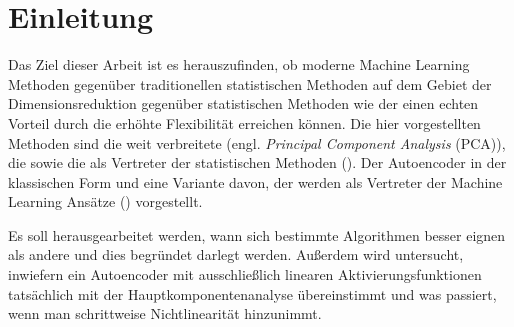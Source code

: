 \chapter{Einleitung}
\label{ch:Enleitung}


Das Ziel dieser Arbeit ist es herauszufinden, ob moderne Machine Learning Methoden gegenüber
traditionellen statistischen Methoden auf dem Gebiet der Dimensionsreduktion gegenüber
statistischen Methoden wie der einen echten Vorteil durch die erhöhte Flexibilität erreichen
können. Die hier vorgestellten Methoden sind die weit verbreitete 
(engl. \textit{Principal Component Analysis} (PCA)), die  sowie die
 als Vertreter der statistischen Methoden
(). Der Autoencoder in der klassischen Form und eine
Variante davon, der  werden als Vertreter der Machine Learning
Ansätze () vorgestellt.

Es soll herausgearbeitet werden, wann sich bestimmte Algorithmen besser eignen als andere und dies
begründet darlegt werden. Außerdem wird untersucht, inwiefern ein Autoencoder mit ausschließlich
linearen Aktivierungsfunktionen tatsächlich mit der Hauptkomponentenanalyse übereinstimmt und was
passiert, wenn man schrittweise Nichtlinearität hinzunimmt.

